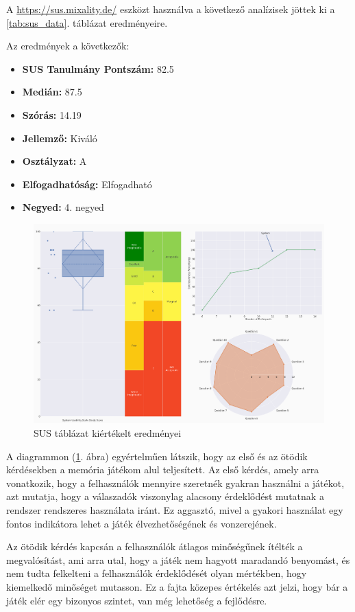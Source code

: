 A \url{https://sus.mixality.de/} eszközt használva a következő analízisek jöttek ki a \ref{tab:sus_data}. táblázat eredményeire. 

Az eredmények a következők: 
\begin{itemize}
    \item \textbf{SUS Tanulmány Pontszám:} 82.5
    \item \textbf{Medián:} 87.5
    \item \textbf{Szórás:} 14.19
    \item \textbf{Jellemző:} Kiváló
    \item \textbf{Osztályzat:} A
    \item \textbf{Elfogadhatóság:} Elfogadható
    \item \textbf{Negyed:} 4. negyed
\end{itemize}

\begin{figure}[h]
    \center
    \includegraphics[width=\textwidth]{img/single_study_plot.png}
    \caption{SUS táblázat kiértékelt eredményei}
    \label{diag:sus_result}
\end{figure}

A diagrammon (\ref{diag:sus_result}. ábra) egyértelműen látszik, hogy az első és az ötödik kérdésekben a memória játékom alul teljesített. Az első kérdés, amely arra vonatkozik, hogy a felhasználók mennyire szeretnék gyakran használni a játékot, azt mutatja, hogy a válaszadók viszonylag alacsony érdeklődést mutatnak a rendszer rendszeres használata iránt. Ez aggasztó, mivel a gyakori használat egy fontos indikátora lehet a játék élvezhetőségének és vonzerejének.

Az ötödik kérdés kapcsán a felhasználók átlagos minőségűnek ítélték a megvalósítást, ami arra utal, hogy a játék nem hagyott maradandó benyomást, és nem tudta felkelteni a felhasználók érdeklődését olyan mértékben, hogy kiemelkedő minőséget mutasson. Ez a fajta közepes értékelés azt jelzi, hogy bár a játék elér egy bizonyos szintet, van még lehetőség a fejlődésre.

